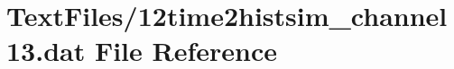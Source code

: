 \hypertarget{12time2histsim__channel13_8dat}{}\section{Text\+Files/12time2histsim\+\_\+channel13.dat File Reference}
\label{12time2histsim__channel13_8dat}

